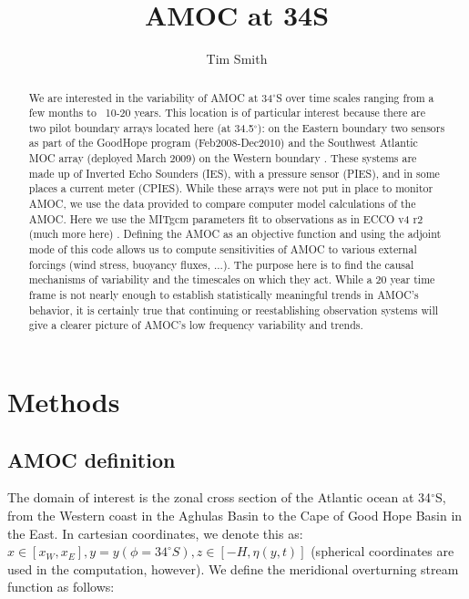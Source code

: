 \documentclass[a4paper,11pt]{article}
\title{\vspace{-10ex}AMOC at 34S}
\author{Tim Smith}
\date{\vspace{-3ex}}
\begin{document}
\maketitle

\begin{abstract}
  We are interested in the variability of AMOC at 34$^{\circ}$S over time scales ranging from a few months to ~10-20 years. This location is of particular interest because there are two pilot boundary arrays located here (at 34.5$^{\circ}$): on the Eastern boundary two sensors as part of the GoodHope program (Feb2008-Dec2010) and the Southwest Atlantic MOC array (deployed March 2009) on the Western boundary \cite{meinenSamoc}. These systems are made up of Inverted Echo Sounders (IES), with a pressure sensor (PIES), and in some places a current meter (CPIES). While these arrays were not put in place to monitor AMOC, we use the data provided to compare computer model calculations of the AMOC. Here we use the MITgcm parameters fit to observations as in ECCO v4 r2 (much more here) \cite{forgetEccov4}. Defining the AMOC as an objective function and using the adjoint mode of this code allows us to compute sensitivities of AMOC to various external forcings (wind stress, buoyancy fluxes, ...). The purpose here is to find the causal mechanisms of variability and the timescales on which they act. While a 20 year time frame is not nearly enough to establish statistically meaningful trends in AMOC's behavior, it is certainly true that continuing or reestablishing observation systems will give a clearer picture of AMOC's low frequency variability and trends. 
\end{abstract}

\section{Methods}
\label{methods}
  
  \subsection{AMOC definition}
  
    The domain of interest is the zonal cross section of the Atlantic ocean at 34$^{\circ}$S, from the Western coast in the Aghulas Basin to the Cape of Good Hope Basin in the East. In cartesian coordinates, we denote this as: $x \in [x_W,x_E], y = y(\phi=34^{\circ}S), z \in [-H,\eta(y,t)]$ (spherical coordinates are used in the computation, however).  We define the meridional overturning stream function as follows: 
    
\end{document}
